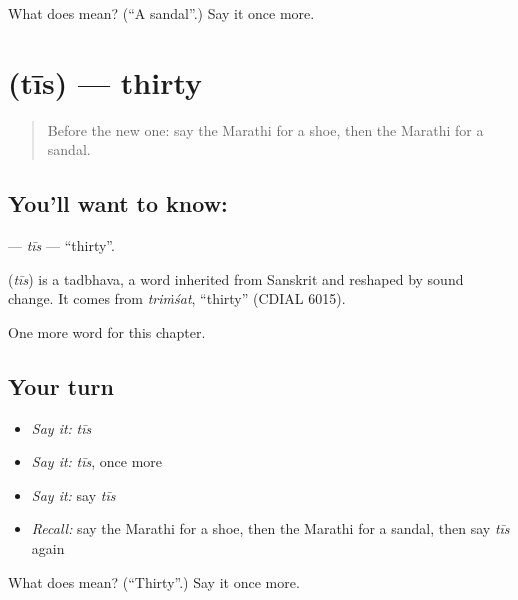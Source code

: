\begin{tcolorbox}[breakable,colback=teal!4,colframe=teal!35!black,title={Before you move on}]
What does  mean? (\textquotedblleft{}A sandal\textquotedblright{}.) Say it once more.
\end{tcolorbox}
\section[\texorpdfstring{\mr{तीस} (tīs)}{तीस (tīs)}]{ (tīs) — thirty}

\label{lesson:MR-C117-tis}



\begin{quote}
Before the new one: say the Marathi for a shoe, then the Marathi for a sandal.
\end{quote}

\subsection*{You'll want to know: }
\textbf{} — \emph{tīs} — \textquotedblleft{}thirty\textquotedblright{}.

\begin{cousinweb}
\textbf{} (\emph{tīs}) is a tadbhava, a word inherited from Sanskrit and reshaped by sound change. It comes from \emph{triṁśat}, \textquotedblleft{}thirty\textquotedblright{} (CDIAL 6015).
\end{cousinweb}

\begin{grammarlens}[title={What you've built}]
One more word for this chapter.
\end{grammarlens}

\subsection*{Your turn}
\begin{itemize}
\raggedright
  \item \emph{Say it:} \emph{tīs}
  \item \emph{Say it:} \emph{tīs}, once more
  \item \emph{Say it:} say \emph{tīs}
  \item \emph{Recall:} say the Marathi for a shoe, then the Marathi for a sandal, then say \emph{tīs} again
\end{itemize}

\begin{tcolorbox}[breakable,colback=teal!4,colframe=teal!35!black,title={Before you move on}]
What does  mean? (\textquotedblleft{}Thirty\textquotedblright{}.) Say it once more.
\end{tcolorbox}
